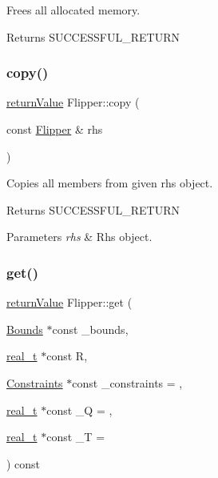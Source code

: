 Frees all allocated memory. \begin{DoxyReturn}{Returns}
S\+U\+C\+C\+E\+S\+S\+F\+U\+L\+\_\+\+R\+E\+T\+U\+RN 
\end{DoxyReturn}
\mbox{\label{class_flipper_a42dc33c257f037e89b65a923d6d5b093}} 
\subsubsection{\texorpdfstring{copy()}{copy()}}
{\footnotesize\ttfamily \hyperlink{_message_handling_8hpp_a81d556f613bfbabd0b1f9488c0fa865e}{return\+Value} Flipper\+::copy (\begin{DoxyParamCaption}\item[{const \hyperlink{class_flipper}{Flipper} \&}]{rhs }\end{DoxyParamCaption})\hspace{0.3cm}{\ttfamily [protected]}}

Copies all members from given rhs object. \begin{DoxyReturn}{Returns}
S\+U\+C\+C\+E\+S\+S\+F\+U\+L\+\_\+\+R\+E\+T\+U\+RN 
\end{DoxyReturn}

\begin{DoxyParams}{Parameters}
{\em rhs} & Rhs object. \\
\hline
\end{DoxyParams}
\mbox{\label{class_flipper_aba5d377c7d818ede730d7990da62046e}} 
\subsubsection{\texorpdfstring{get()}{get()}}
{\footnotesize\ttfamily \hyperlink{_message_handling_8hpp_a81d556f613bfbabd0b1f9488c0fa865e}{return\+Value} Flipper\+::get (\begin{DoxyParamCaption}\item[{\hyperlink{class_bounds}{Bounds} $\ast$const}]{\+\_\+bounds,  }\item[{\hyperlink{qp_o_a_s_e_s__wrapper_8h_a0d00e2b3dfadee81331bbb39068570c4}{real\+\_\+t} $\ast$const}]{R,  }\item[{\hyperlink{class_constraints}{Constraints} $\ast$const}]{\+\_\+constraints = {},  }\item[{\hyperlink{qp_o_a_s_e_s__wrapper_8h_a0d00e2b3dfadee81331bbb39068570c4}{real\+\_\+t} $\ast$const}]{\+\_\+Q = {},  }\item[{\hyperlink{qp_o_a_s_e_s__wrapper_8h_a0d00e2b3dfadee81331bbb39068570c4}{real\+\_\+t} $\ast$const}]{\+\_\+T = {} }\end{DoxyParamCaption}) const}

